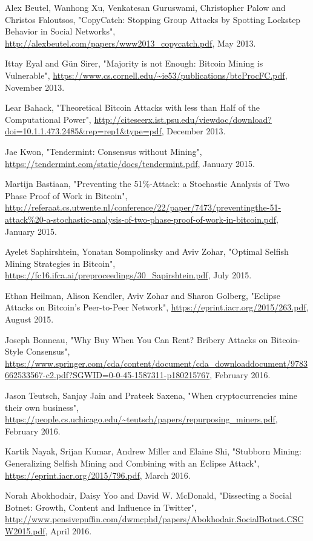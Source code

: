 \documentclass[12pt,a4paper]{article}
\begin{document}
\begin{thebibliography}{9}
Alex Beutel, Wanhong Xu, Venkatesan Guruswami, Christopher Palow and Christos Faloutsos,
"CopyCatch: Stopping Group Attacks by Spotting Lockstep Behavior in Social Networks",
\url{http://alexbeutel.com/papers/www2013_copycatch.pdf},
May 2013.

Ittay Eyal and Gün Sirer,
"Majority is not Enough: Bitcoin Mining is Vulnerable",
\url{https://www.cs.cornell.edu/~ie53/publications/btcProcFC.pdf},
November 2013.

Lear Bahack,
"Theoretical Bitcoin Attacks with less than Half of the Computational Power",
\url{http://citeseerx.ist.psu.edu/viewdoc/download?doi=10.1.1.473.2485&rep=rep1&type=pdf},
December 2013.

Jae Kwon,
"Tendermint: Consensus without Mining",
\url{https://tendermint.com/static/docs/tendermint.pdf},
January 2015.

Martijn Bastiaan,
"Preventing the 51\%-Attack: a Stochastic Analysis of Two Phase Proof of Work in Bitcoin",
\url{http://referaat.cs.utwente.nl/conference/22/paper/7473/preventingthe-51-attack%20-a-stochastic-analysis-of-two-phase-proof-of-work-in-bitcoin.pdf},
January 2015.

Ayelet Saphirshtein, Yonatan Sompolinsky and Aviv Zohar,
"Optimal Selfish Mining Strategies in Bitcoin",
\url{https://fc16.ifca.ai/preproceedings/30_Sapirshtein.pdf},
July 2015.

Ethan Heilman, Alison Kendler, Aviv Zohar and Sharon Golberg,
"Eclipse Attacks on Bitcoin’s Peer-to-Peer Network",
\url{https://eprint.iacr.org/2015/263.pdf},
August 2015.

Joseph Bonneau,
"Why Buy When You Can Rent? Bribery Attacks on Bitcoin-Style Consensus",
\url{https://www.springer.com/cda/content/document/cda_downloaddocument/9783662533567-c2.pdf?SGWID=0-0-45-1587311-p180215767},
February 2016.

Jason Teutsch, Sanjay Jain and Prateek Saxena,
"When cryptocurrencies mine their own business",
\url{https://people.cs.uchicago.edu/~teutsch/papers/repurposing_miners.pdf},
February 2016.

Kartik Nayak, Srijan Kumar, Andrew Miller and Elaine Shi,
"Stubborn Mining: Generalizing Selfish Mining and Combining with an Eclipse Attack",
\url{https://eprint.iacr.org/2015/796.pdf},
March 2016.

Norah Abokhodair, Daisy Yoo and David W. McDonald,
"Dissecting a Social Botnet: Growth, Content and Influence in Twitter",
\url{http://www.pensivepuffin.com/dwmcphd/papers/Abokhodair.SocialBotnet.CSCW2015.pdf},
April 2016.


\end{thebibliography}
\end{document}
